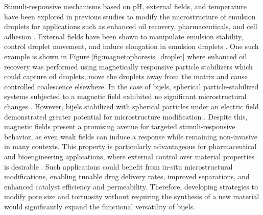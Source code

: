 Stimuli-responsive mechanisms based on pH, external fields, and temperature have been explored in previous studies to modify the microstructure of emulsion 
droplets for applications such as enhanced oil recovery, pharmaceuticals, and cell adhesion 
\cite{haase_nanoparticle_2011, tham_magnetophoresis_2021, cui_stabilizing_2013, manfredini_limonene--water_2021}. External fields have been shown to 
manipulate emulsion stability, control droplet movement, and induce elongation in emulsion droplets 
\cite{tham_magnetophoresis_2021, cui_stabilizing_2013, melle_pickering_2005}. One such example is shown in Figure \ref{fig:magnetophoresis_droplet}
where enhanced oil recovery was performed using magnetically responsive particle stabilizers which could capture oil droplets,
move the droplets away from the matrix and cause controlled coalescence elsewhere.
In the case of bijels, spherical particle-stabilized systems subjected to a magnetic field exhibited no significant microstructural changes 
\cite{kim_bijels_2010}. However, bijels stabilized with spherical particles under an electric field demonstrated greater potential for microstructure 
modification \cite{carmack_tuning_2018}. Despite this, magnetic fields present a promising avenue for targeted stimuli-responsive behavior, as even 
weak fields can induce a response while remaining non-invasive in many contexts. This property is particularly advantageous for pharmaceutical and 
bioengineering applications, where external control over material properties is desirable 
\cite{vanoli_bijels_2022, thorson_bijel-templated_2019, thorson_composite_2018}.  
Such applications could benefit from in-situ microstructural modifications, enabling tunable drug delivery rates, improved separations, and enhanced catalyst 
efficiency and permeability. Therefore, developing strategies to modify pore size and tortuosity without requiring the synthesis of a new material would 
significantly expand the functional versatility of bijels.  


